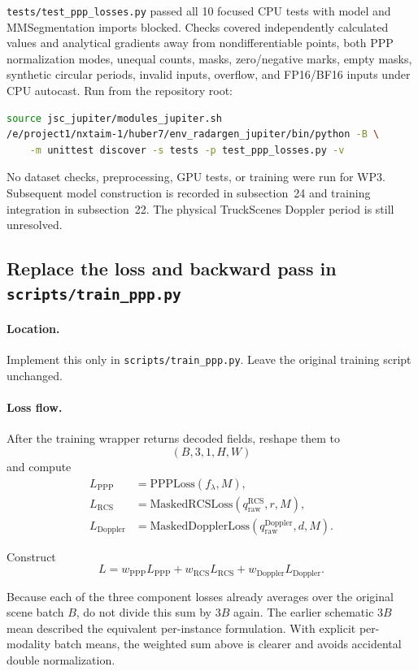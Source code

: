 \documentclass[11pt,a4paper]{article}
\begin{document}
\texttt{tests/test\_ppp\_losses.py} passed all 10 focused CPU tests with
model and MMSegmentation imports blocked. Checks covered independently
calculated values and analytical gradients away from nondifferentiable
points, both PPP normalization modes, unequal counts, masks, zero/negative
marks, empty masks, synthetic circular periods, invalid inputs, overflow,
and FP16/BF16 inputs under CPU autocast. Run from the repository root:
\begin{lstlisting}[language=bash]
source jsc_jupiter/modules_jupiter.sh
/e/project1/nxtaim-1/huber7/env_radargen_jupiter/bin/python -B \
    -m unittest discover -s tests -p test_ppp_losses.py -v
\end{lstlisting}
No dataset checks, preprocessing, GPU tests, or training were run for WP3.
Subsequent model construction is recorded in subsection~24 and training
integration in subsection~22. The physical TruckScenes Doppler period is
still unresolved.

\subsection{Replace the loss and backward pass in \texttt{scripts/train\_ppp.py}}

\paragraph{Location.}
Implement this only in \texttt{scripts/train\_ppp.py}. Leave the original training script unchanged.

\paragraph{Loss flow.}
After the training wrapper returns decoded fields, reshape them to
\[
    (B,3,1,H,W)
\]
and compute
\begin{align*}
L_{\mathrm{PPP}} &= \mathrm{PPPLoss}(f_\lambda,M),\\
L_{\mathrm{RCS}} &= \mathrm{MaskedRCSLoss}(q_{\mathrm{raw}}^{\mathrm{RCS}},r,M),\\
L_{\mathrm{Doppler}} &= \mathrm{MaskedDopplerLoss}(q_{\mathrm{raw}}^{\mathrm{Doppler}},d,M).
\end{align*}

Construct
\[
    L
    =
    w_{\mathrm{PPP}}L_{\mathrm{PPP}}
    +
    w_{\mathrm{RCS}}L_{\mathrm{RCS}}
    +
    w_{\mathrm{Doppler}}L_{\mathrm{Doppler}}.
\]

Because each of the three component losses already averages over the original scene batch \(B\), do not divide this sum by \(3B\) again. The earlier schematic \(3B\) mean described the equivalent per-instance formulation. With explicit per-modality batch means, the weighted sum above is clearer and avoids accidental double normalization.
\end{document}
